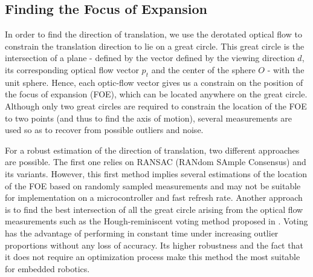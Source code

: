 \subsection{Finding the Focus of Expansion}
In order to find the direction of translation, we use the derotated optical flow to constrain the translation direction to lie on a great circle. This great circle is the intersection of a plane - defined by the vector defined by the viewing direction $d$, its corresponding optical flow vector $p_t$ and the center of the sphere $O$ - with the unit sphere. Hence, each optic-flow vector gives us a constrain on the position of the focus of expansion (FOE), which can be located anywhere on the great circle. Although only two great circles are required to constrain the location of the FOE to two points (and thus to find the axis of motion), several measurements are used so as to recover from possible outliers and noise.

For a robust estimation of the direction of translation, two different approaches are possible. The first one relies on RANSAC (RANdom SAmple Consensus) and its variants. However, this first method implies several estimations of the location of the FOE based on randomly sampled measurements and may not be suitable for implementation on a microcontroller and fast refresh rate. Another approach is to find the best intersection of all the great circle arising from the optical flow measurements such as the Hough-reminiscent voting method proposed in \cite{lim}. Voting has the advantage of performing in constant time under increasing outlier proportions without any loss of accuracy. Its higher robustness and the fact that it does not require an optimization process make this method the most suitable for embedded robotics. 
 

